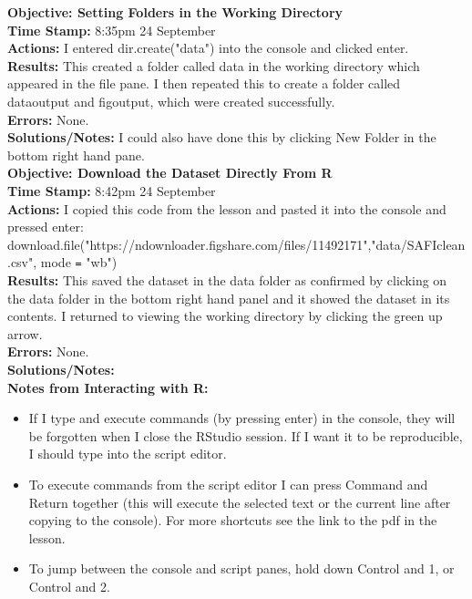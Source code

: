 \documentclass{article}
\begin{document}
\begin{FlushLeft}
\vspace{5mm}
\textbf{Objective: Setting Folders in the Working Directory}\\ 
\textbf{Time Stamp:} 8:35pm 24 September\\
\textbf{Actions:} I entered dir.create("data") into the console and clicked enter. \\
\textbf{Results:} This created a folder called data in the working directory which appeared in the file pane. I then repeated this to create a folder called data\textunderscore output and fig\textunderscore output, which were created successfully.\\
\textbf{Errors:} None.\\
\textbf{Solutions/Notes:} I could also have done this by clicking New Folder in the bottom right hand pane.\\
\vspace{5mm}
\textbf{Objective: Download the Dataset Directly From R}\\ 
\textbf{Time Stamp:} 8:42pm 24 September\\
\textbf{Actions:} I copied this code from the lesson and pasted it into the console and pressed enter:\\ download.file("https://ndownloader.figshare.com/files/11492171","data/SAFI\textunderscore clean.csv", mode \verb|=| "wb")\\
\textbf{Results:} This saved the dataset in the data folder as confirmed by clicking on the data folder in the bottom right hand panel and it showed the dataset in its contents. I returned to viewing the working directory by clicking the green up arrow.\\
\textbf{Errors:} None.\\
\textbf{Solutions/Notes:}\\
\vspace{5mm}
\textbf{Notes from Interacting with R:} 
\begin{itemize}
    \item If I type and execute commands (by pressing enter) in the console, they will be forgotten when I close the RStudio session. If I want it to be reproducible, I should type into the script editor.
    \item To execute commands from the script editor I can press Command and Return together (this will execute the selected text or the current line after copying to the console). For more shortcuts see the link to the pdf in the lesson.
    \item To jump between the console and script panes, hold down Control and 1, or Control and 2.

\end{itemize}
\end{FlushLeft}
\end{document}
